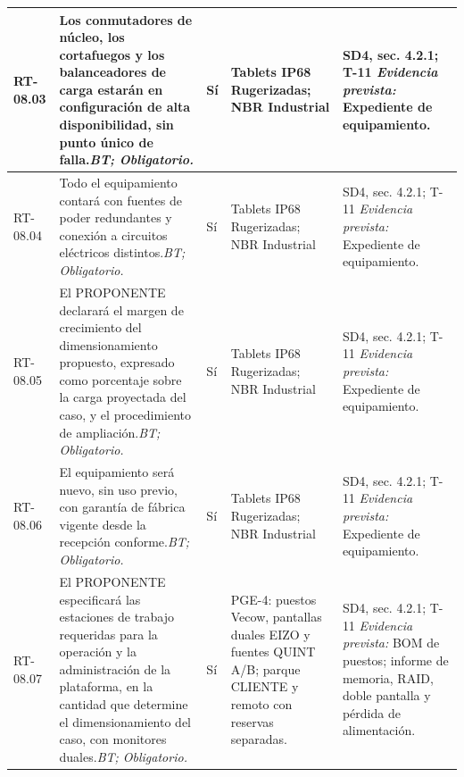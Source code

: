 \begin{paginaHorizontalSynaptix}
\begin{longtable}{|L{0.09\AnchoMatrizTDoce}|L{0.385\AnchoMatrizTDoce}|L{0.065\AnchoMatrizTDoce}|L{0.18\AnchoMatrizTDoce}|L{0.28\AnchoMatrizTDoce}|}
RT-\allowbreak{}08.\allowbreak{}03 &
Los conmutadores de núcleo, los cortafuegos y los balanceadores de carga estarán en configuración de alta disponibilidad, sin punto único de falla.\newline\textit{BT; Obligatorio.} &
Sí &
Tablets IP68 Rugerizadas; NBR Industrial &
SD4, sec. 4.2.1; T-11 \newline\textit{Evidencia prevista:} Expediente de equipamiento. \\ \hline

RT-\allowbreak{}08.\allowbreak{}04 &
Todo el equipamiento contará con fuentes de poder redundantes y conexión a circuitos eléctricos distintos.\newline\textit{BT; Obligatorio.} &
Sí &
Tablets IP68 Rugerizadas; NBR Industrial &
SD4, sec. 4.2.1; T-11 \newline\textit{Evidencia prevista:} Expediente de equipamiento. \\ \hline

RT-\allowbreak{}08.\allowbreak{}05 &
El PROPONENTE declarará el margen de crecimiento del dimensionamiento propuesto, expresado como porcentaje sobre la carga proyectada del caso, y el procedimiento de ampliación.\newline\textit{BT; Obligatorio.} &
Sí &
Tablets IP68 Rugerizadas; NBR Industrial &
SD4, sec. 4.2.1; T-11 \newline\textit{Evidencia prevista:} Expediente de equipamiento. \\ \hline

RT-\allowbreak{}08.\allowbreak{}06 &
El equipamiento será nuevo, sin uso previo, con garantía de fábrica vigente desde la recepción conforme.\newline\textit{BT; Obligatorio.} &
Sí &
Tablets IP68 Rugerizadas; NBR Industrial &
SD4, sec. 4.2.1; T-11 \newline\textit{Evidencia prevista:} Expediente de equipamiento. \\ \hline

RT-\allowbreak{}08.\allowbreak{}07 &
El PROPONENTE especificará las estaciones de trabajo requeridas para la operación y la administración de la plataforma, en la cantidad que determine el dimensionamiento del caso, con monitores duales.\newline\textit{BT; Obligatorio.} &
Sí &
PGE-4: puestos Vecow, pantallas duales EIZO y fuentes QUINT A/\allowbreak{}B; parque CLIENTE y remoto con reservas separadas. &
SD4, sec. 4.2.1; T-11 \newline\textit{Evidencia prevista:} BOM de puestos; informe de memoria, RAID, doble pantalla y pérdida de alimentación. \\ \hline


\end{longtable}
\end{paginaHorizontalSynaptix}
